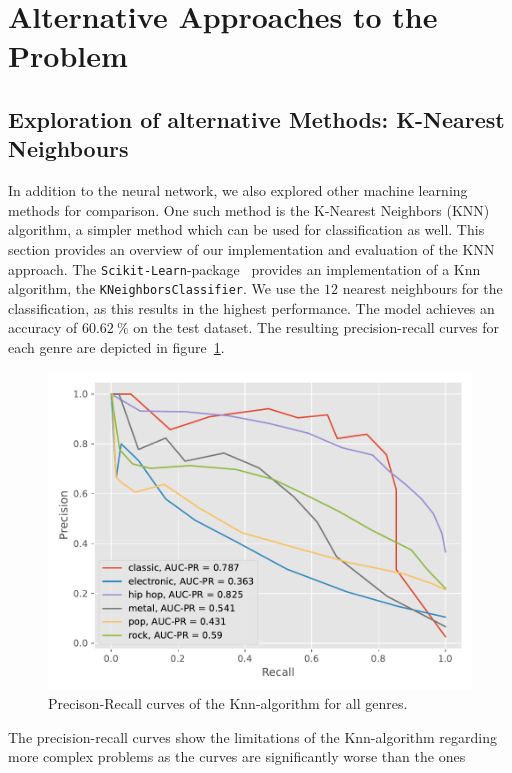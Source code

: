 \documentclass[
  12pt,
  bibliography=totoc,     %
  captions=tableheading,  %
  titlepage=firstiscover, %
]{scrartcl}
\begin{document}
\section{Alternative Approaches to the Problem}
\subsection{Exploration of alternative Methods: K-Nearest Neighbours}
In addition to the neural network, we also explored other machine learning methods for comparison. One such method is the K-Nearest Neighbors (KNN) algorithm, a simpler
method which can be used for classification as well. This section provides an overview of our implementation and evaluation of the KNN approach.
The \texttt{Scikit-Learn}-package~\cite{scikit-learn} provides an implementation of a Knn algorithm, the \texttt{KNeighborsClassifier}.
We use the $12$ nearest neighbours for the classification, as this results in the highest performance. The model achieves an accuracy of $\SI{60.62}{\percent}$ on the test
dataset.
The resulting precision-recall curves for each genre are depicted in figure~\ref{fig:pr_knn}.
\begin{figure}[H]
  \centering
  \includegraphics[scale=0.7]{figures/knn/PR_KNN.pdf}
  \caption{Precison-Recall curves of the Knn-algorithm for all genres.}
  \label{fig:pr_knn}
\end{figure}
\noindent
The precision-recall curves show the limitations of the Knn-algorithm regarding more complex problems as the curves are significantly worse than the ones
\end{document}
